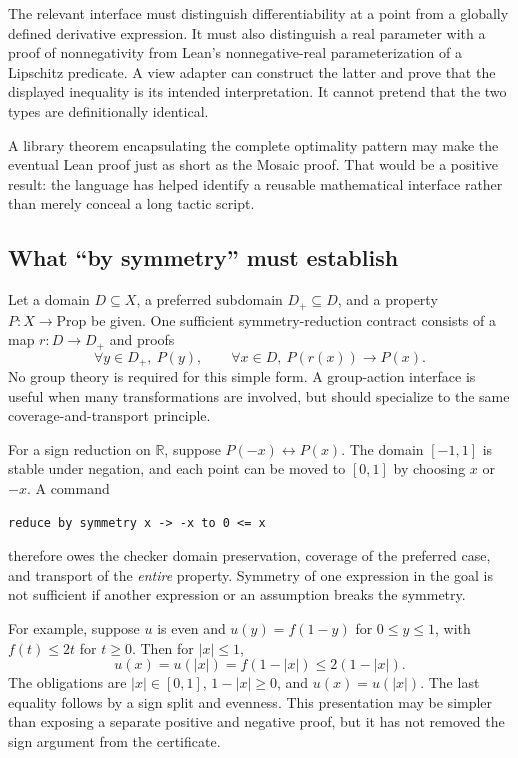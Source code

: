 \documentclass[11pt,a4paper]{article}
\newcommand{\R}{\mathbb R}
\theoremstyle{definition}
\theoremstyle{remark}
\begin{document}
The relevant interface must distinguish differentiability at a point from a globally defined derivative expression. It must also distinguish a real parameter with a proof of nonnegativity from Lean's nonnegative-real parameterization of a Lipschitz predicate. A view adapter can construct the latter and prove that the displayed inequality is its intended interpretation. It cannot pretend that the two types are definitionally identical.

A library theorem encapsulating the complete optimality pattern may make the eventual Lean proof just as short as the Mosaic proof. That would be a positive result: the language has helped identify a reusable mathematical interface rather than merely conceal a long tactic script.

\subsection{What ``by symmetry'' must establish}
Let a domain $D\subseteq X$, a preferred subdomain $D_+\subseteq D$, and a property $P:X\to\mathrm{Prop}$ be given. One sufficient symmetry-reduction contract consists of a map $r:D\to D_+$ and proofs
\[
 \forall y\in D_+,\ P(y),
 \qquad
 \forall x\in D,\ P(r(x))\to P(x).
\]
No group theory is required for this simple form. A group-action interface is useful when many transformations are involved, but should specialize to the same coverage-and-transport principle.

For a sign reduction on $\R$, suppose $P(-x)\leftrightarrow P(x)$. The domain $[-1,1]$ is stable under negation, and each point can be moved to $[0,1]$ by choosing $x$ or $-x$. A command
\begin{lstlisting}
reduce by symmetry x -> -x to 0 <= x
\end{lstlisting}
therefore owes the checker domain preservation, coverage of the preferred case, and transport of the \emph{entire} property. Symmetry of one expression in the goal is not sufficient if another expression or an assumption breaks the symmetry.

For example, suppose $u$ is even and $u(y)=f(1-y)$ for $0\le y\le1$, with $f(t)\le2t$ for $t\ge0$. Then for $|x|\le1$,
\[
 u(x)=u(|x|)=f(1-|x|)\le2(1-|x|).
\]
The obligations are $|x|\in[0,1]$, $1-|x|\ge0$, and $u(x)=u(|x|)$. The last equality follows by a sign split and evenness. This presentation may be simpler than exposing a separate positive and negative proof, but it has not removed the sign argument from the certificate.
\end{document}
